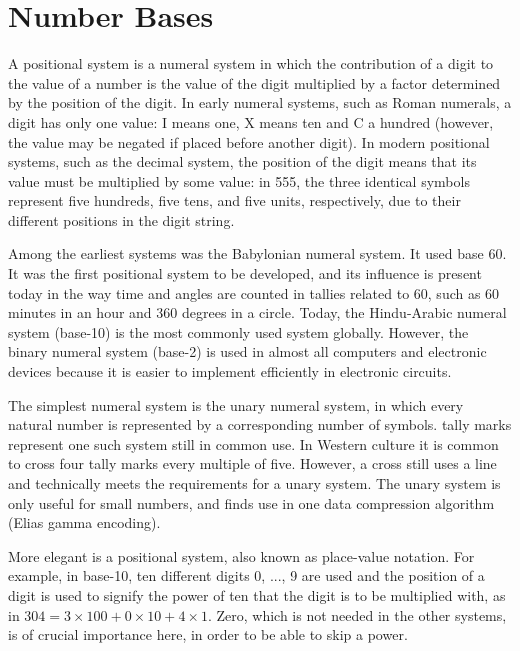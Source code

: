 
\chapter{Number Bases\label{sec:numbers}}
\setcounter{examples}{1}

A positional system is a numeral system in which the contribution of a digit to the value of a number 
is the value of the digit multiplied by a factor determined by the position of the digit. In early 
numeral systems, such as Roman numerals, a digit has only one value: I means one, X means ten and C 
a hundred (however, the value may be negated if placed before another digit). In modern positional 
systems, such as the decimal system, the position of the digit means that its value must be multiplied 
by some value: in 555, the three identical symbols represent five hundreds, five tens, and five units, 
respectively, due to their different positions in the digit string. 

Among the earliest systems was the Babylonian numeral system. It used base 60. It was the first 
positional system to be developed, and its influence is present today in the way time and angles are 
counted in tallies related to 60, such as 60 minutes in an hour and 360 degrees in a circle. Today, 
the Hindu-Arabic numeral system (\gls{base-10}) is the most commonly used system globally. However,  
the binary numeral system (\gls{base-2}) is used in almost all computers and electronic devices because it 
is easier to implement efficiently in electronic circuits. 

The simplest numeral system is the unary numeral system, in which every natural number is represented by 
a corresponding number of symbols. \Gls{tally marks} represent one such system still in common use. In Western 
culture it is common to cross four tally marks every multiple of five. However, a cross still uses a line 
and technically meets the requirements for a unary system. The unary system is only useful for small numbers, 
and finds use in one data compression algorithm (Elias gamma encoding).

More elegant is a positional system, also known as place-value notation. For example, in \gls{base-10}, ten 
different digits 0, ..., 9 are used and the position of a digit is used to signify the power of ten that the 
digit is to be multiplied with, as in $304 = 3 \times 100 + 0 \times 10 + 4 \times 1$. Zero, which is not 
needed in the other systems, is of crucial importance here, in order to be able to skip a power.

